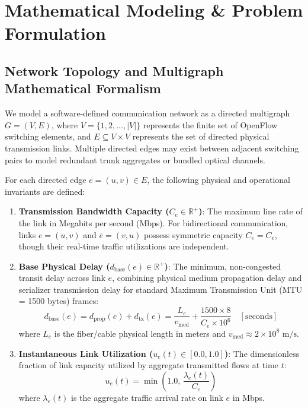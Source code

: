 \chapter{Mathematical Modeling \& Problem Formulation}
\label{chap:formulation}

\section{Network Topology and Multigraph Mathematical Formalism}
We model a software-defined communication network as a directed multigraph $G = (V, E)$, where $V = \{1, 2, \dots, |V|\}$ represents the finite set of OpenFlow switching elements, and $E \subseteq V \times V$ represents the set of directed physical transmission links. Multiple directed edges may exist between adjacent switching pairs to model redundant trunk aggregates or bundled optical channels.

For each directed edge $e = (u, v) \in E$, the following physical and operational invariants are defined:
\begin{enumerate}
    \item \textbf{Transmission Bandwidth Capacity ($C_e \in \mathbb{R}^+$)}: The maximum line rate of the link in Megabits per second (Mbps). For bidirectional communication, links $e = (u, v)$ and $\bar{e} = (v, u)$ possess symmetric capacity $C_e = C_{\bar{e}}$, though their real-time traffic utilizations are independent.
    \item \textbf{Base Physical Delay ($d_{\text{base}}(e) \in \mathbb{R}^+$)}: The minimum, non-congested transit delay across link $e$, combining physical medium propagation delay and serializer transmission delay for standard Maximum Transmission Unit (MTU = 1500 bytes) frames:
    \begin{equation}
        d_{\text{base}}(e) = d_{\text{prop}}(e) + d_{\text{tx}}(e) = \frac{L_e}{v_{\text{med}}} + \frac{1500 \times 8}{C_e \times 10^6} \quad [\text{seconds}]
    \end{equation}
    where $L_e$ is the fiber/cable physical length in meters and $v_{\text{med}} \approx 2 \times 10^8\text{ m/s}$.
    \item \textbf{Instantaneous Link Utilization ($u_e(t) \in [0.0, 1.0]$)}: The dimensionless fraction of link capacity utilized by aggregate transmitted flows at time $t$:
    \begin{equation}
        u_e(t) = \min\left(1.0, \, \frac{\lambda_e(t)}{C_e}\right)
    \end{equation}
    where $\lambda_e(t)$ is the aggregate traffic arrival rate on link $e$ in Mbps.
\end{enumerate}

